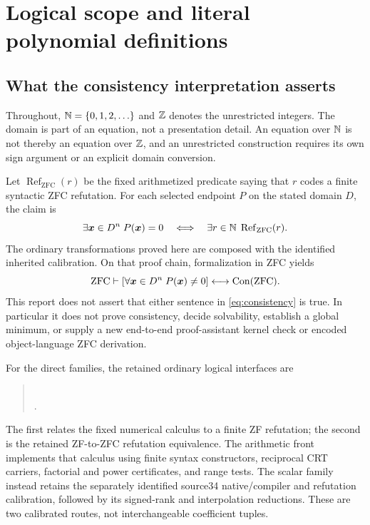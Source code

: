 \section{Logical scope and literal polynomial definitions}
\label{sec:foundation}
\subsection{What the consistency interpretation asserts}
Throughout, $\mathbb N=\{0,1,2,\ldots\}$ and $\mathbb Z$ denotes the unrestricted integers.
The domain is part of an equation, not a presentation detail. An equation over
$\mathbb N$ is not thereby an equation over $\mathbb Z$, and an unrestricted construction
requires its own sign argument or an explicit domain conversion.

Let $\operatorname{Ref}_{\mathrm{ZFC}}(r)$ be the fixed arithmetized predicate
saying that $r$ codes a finite syntactic ZFC refutation. For each selected
endpoint $P$ on the stated domain $D$, the claim is
\begin{equation}\label{eq:calibration}
 \exists\boldsymbol{x}\in D^n\;P(\boldsymbol{x})=0
 \quad\Longleftrightarrow\quad
 \exists r\in\mathbb N\;\operatorname{Ref}_{\mathrm{ZFC}}(r).
\end{equation}
The ordinary transformations proved here are composed with the identified
inherited calibration. On that proof chain, formalization in ZFC yields
\begin{equation}\label{eq:consistency}
 \mathrm{ZFC}\vdash
 \left[\forall\boldsymbol{x}\in D^n\;P(\boldsymbol{x})\ne0\right]
 \longleftrightarrow\operatorname{Con}(\mathrm{ZFC}).
\end{equation}
This report does not assert that either sentence in
\eqref{eq:consistency} is true. In particular it does not prove consistency,
decide solvability, establish a global minimum, or supply a new end-to-end
proof-assistant kernel check or encoded object-language ZFC derivation.

For the direct families, the retained ordinary logical interfaces are
\begin{quote}\small
{}\\
.
\end{quote}
The first relates the fixed numerical calculus to a finite ZF refutation;
the second is the retained ZF-to-ZFC refutation equivalence. The arithmetic
front implements that calculus using finite syntax constructors, reciprocal
CRT carriers, factorial and power certificates, and range tests. The scalar
family instead retains the separately identified source34 native/compiler
and refutation calibration, followed by its signed-rank and interpolation
reductions. These are two calibrated routes, not interchangeable coefficient
tuples.

